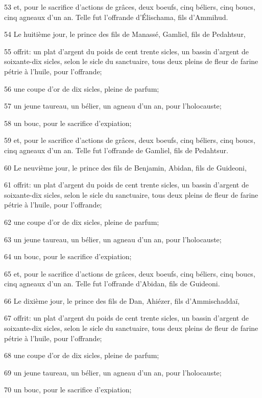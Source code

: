 \par 53 et, pour le sacrifice d'actions de grâces, deux boeufs, cinq béliers, cinq boucs, cinq agneaux d'un an. Telle fut l'offrande d'Élischama, fils d'Ammihud.
\par 54 Le huitième jour, le prince des fils de Manassé, Gamliel, fils de Pedahtsur,
\par 55 offrit: un plat d'argent du poids de cent trente sicles, un bassin d'argent de soixante-dix sicles, selon le sicle du sanctuaire, tous deux pleins de fleur de farine pétrie à l'huile, pour l'offrande;
\par 56 une coupe d'or de dix sicles, pleine de parfum;
\par 57 un jeune taureau, un bélier, un agneau d'un an, pour l'holocauste;
\par 58 un bouc, pour le sacrifice d'expiation;
\par 59 et, pour le sacrifice d'actions de grâces, deux boeufs, cinq béliers, cinq boucs, cinq agneaux d'un an. Telle fut l'offrande de Gamliel, fils de Pedahtsur.
\par 60 Le neuvième jour, le prince des fils de Benjamin, Abidan, fils de Guideoni,
\par 61 offrit: un plat d'argent du poids de cent trente sicles, un bassin d'argent de soixante-dix sicles, selon le sicle du sanctuaire, tous deux pleins de fleur de farine pétrie à l'huile, pour l'offrande;
\par 62 une coupe d'or de dix sicles, pleine de parfum;
\par 63 un jeune taureau, un bélier, un agneau d'un an, pour l'holocauste;
\par 64 un bouc, pour le sacrifice d'expiation;
\par 65 et, pour le sacrifice d'actions de grâces, deux boeufs, cinq béliers, cinq boucs, cinq agneaux d'un an. Telle fut l'offrande d'Abidan, fils de Guideoni.
\par 66 Le dixième jour, le prince des fils de Dan, Ahiézer, fils d'Ammischaddaï,
\par 67 offrit: un plat d'argent du poids de cent trente sicles, un bassin d'argent de soixante-dix sicles, selon le sicle du sanctuaire, tous deux pleins de fleur de farine pétrie à l'huile, pour l'offrande;
\par 68 une coupe d'or de dix sicles, pleine de parfum;
\par 69 un jeune taureau, un bélier, un agneau d'un an, pour l'holocauste;
\par 70 un bouc, pour le sacrifice d'expiation;
